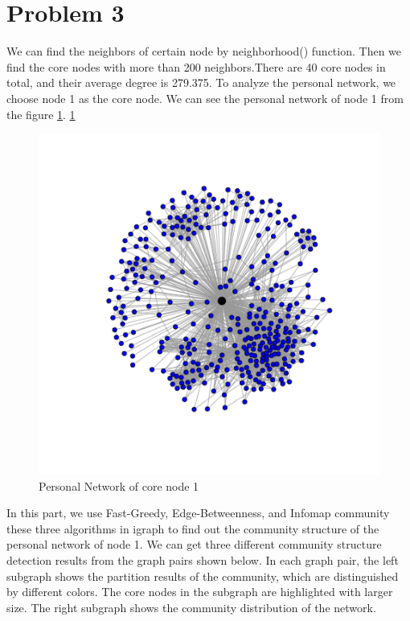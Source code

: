 \documentclass{article}
\begin{document}
\section{Problem 3}
We can find the neighbors of certain node by neighborhood() function. Then we find the core nodes with more than 200 neighbors.There are 40 core nodes in total, and their average degree is 279.375.
To analyze the personal network, we choose node 1 as the core node. We can see the personal network of node 1 from the figure \ref{fig:p3_1}.
\ref{fig:p3_1}
\begin{figure}[htbp]
\centering
\includegraphics[width=.8\textwidth]{3_1.png}
\caption{Personal Network of core node 1}
\label{fig:p3_1}
\end{figure}
In this part, we use Fast-Greedy, Edge-Betweenness, and Infomap community these three algorithms in igraph to find out the community structure of the personal network of node 1. 
We can get three different community structure detection results from the graph pairs shown below. In each graph pair, the left subgraph shows the partition results of the community, which are distinguished by different colors. The core nodes in the subgraph are highlighted with larger size. The right subgraph shows the community distribution of the network.\\
\\
\end{document}
